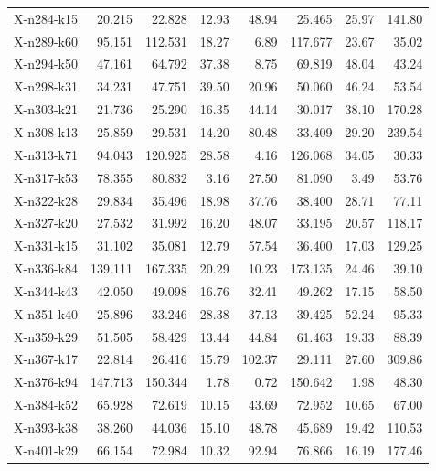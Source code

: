 \begin{longtable}{@{}lrrrrrrr@{}}
X-n284-k15   &     20.215 &      22.828 &  12.93 &  48.94 &      25.465 &  25.97 & 141.80 \\
X-n289-k60   &     95.151 &     112.531 &  18.27 &   6.89 &     117.677 &  23.67 &  35.02 \\
X-n294-k50   &     47.161 &      64.792 &  37.38 &   8.75 &      69.819 &  48.04 &  43.24 \\
X-n298-k31   &     34.231 &      47.751 &  39.50 &  20.96 &      50.060 &  46.24 &  53.54 \\
X-n303-k21   &     21.736 &      25.290 &  16.35 &  44.14 &      30.017 &  38.10 & 170.28 \\
X-n308-k13   &     25.859 &      29.531 &  14.20 &  80.48 &      33.409 &  29.20 & 239.54 \\
X-n313-k71   &     94.043 &     120.925 &  28.58 &   4.16 &     126.068 &  34.05 &  30.33 \\
X-n317-k53   &     78.355 &      80.832 &   3.16 &  27.50 &      81.090 &   3.49 &  53.76 \\
X-n322-k28   &     29.834 &      35.496 &  18.98 &  37.76 &      38.400 &  28.71 &  77.11 \\
X-n327-k20   &     27.532 &      31.992 &  16.20 &  48.07 &      33.195 &  20.57 & 118.17 \\
X-n331-k15   &     31.102 &      35.081 &  12.79 &  57.54 &      36.400 &  17.03 & 129.25 \\
X-n336-k84   &    139.111 &     167.335 &  20.29 &  10.23 &     173.135 &  24.46 &  39.10 \\
X-n344-k43   &     42.050 &      49.098 &  16.76 &  32.41 &      49.262 &  17.15 &  58.50 \\
X-n351-k40   &     25.896 &      33.246 &  28.38 &  37.13 &      39.425 &  52.24 &  95.33 \\
X-n359-k29   &     51.505 &      58.429 &  13.44 &  44.84 &      61.463 &  19.33 &  88.39 \\
X-n367-k17   &     22.814 &      26.416 &  15.79 & 102.37 &      29.111 &  27.60 & 309.86 \\
X-n376-k94   &    147.713 &     150.344 &   1.78 &   0.72 &     150.642 &   1.98 &  48.30 \\
X-n384-k52   &     65.928 &      72.619 &  10.15 &  43.69 &      72.952 &  10.65 &  67.00 \\
X-n393-k38   &     38.260 &      44.036 &  15.10 &  48.78 &      45.689 &  19.42 & 110.53 \\
X-n401-k29   &     66.154 &      72.984 &  10.32 &  92.94 &      76.866 &  16.19 & 177.46 \\

\end{longtable}
